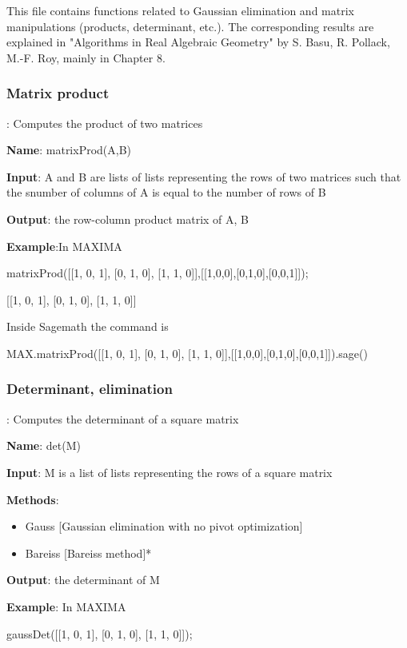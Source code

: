 \documentclass{article}
\begin{document}
This file contains functions related to Gaussian elimination and matrix
manipulations (products, determinant, etc.). The corresponding results are explained in "Algorithms in Real Algebraic
Geometry" by S. Basu, R. Pollack, M.-F. Roy, mainly in Chapter 8.


\subsubsection{Matrix product}

:
  Computes the product of two matrices
  
 {\bf Name}: matrixProd(A,B)
  
 {\bf Input}: A and B are lists of lists representing the rows of two matrices
  such that the snumber of columns of A is equal to the number of rows of B
  
 {\bf Output}: the row-column product matrix of A, B
  
 {\bf Example}:In MAXIMA

matrixProd([[1, 0, 1], [0, 1, 0], [1, 1, 0]],[[1,0,0],[0,1,0],[0,0,1]]);

[[1, 0, 1], [0, 1, 0], [1, 1, 0]]

\noindent  Inside Sagemath the command is

MAX.matrixProd([[1, 0, 1], [0, 1, 0], [1, 1, 0]],[[1,0,0],[0,1,0],[0,0,1]]).sage()

 
\subsubsection{Determinant, elimination}

: Computes the determinant of a square matrix
  
   {\bf Name}:   det(M)
  
 {\bf Input}: 
M is a list of lists representing the rows of a square matrix

 {\bf Methods}:
  \begin{itemize}
    \item Gauss [Gaussian elimination with no pivot optimization]
    \item Bareiss [Bareiss method]*
  \end{itemize}

 {\bf Output}:  the determinant of M
  
 {\bf Example}: In MAXIMA

gaussDet([[1, 0, 1], [0, 1, 0], [1, 1, 0]]);
\end{document}
